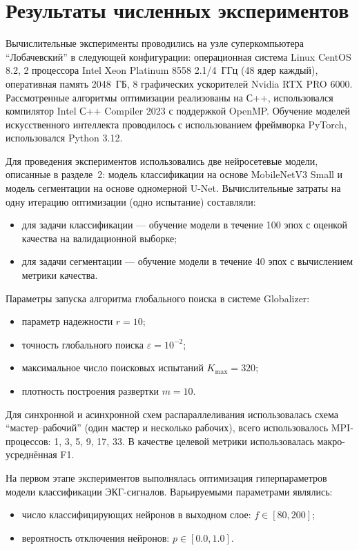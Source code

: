 \documentclass[10pt,a4paper]{book}
\begin{document}
\section{Результаты численных экспериментов}
\label{sec-result}

Вычислительные эксперименты проводились на узле суперкомпьютера ``Лобачевский'' в следующей конфигурации: операционная система Linux CentOS 8.2, 2 процессора Intel Xeon Platinum 8558 2.1/4~ГГц (48 ядер каждый), оперативная память 2048~ГБ, 8 графических ускорителей Nvidia RTX PRO 6000. Рассмотренные алгоритмы оптимизации реализованы на С++, использовался компилятор Intel С++ Compiler 2023 с поддержкой OpenMP. Обучение моделей искусственного интеллекта проводилось с использованием фреймворка PyTorch, использовался Python 3.12.

Для проведения экспериментов использовались две нейросетевые модели, описанные в разделе~2: модель классификации на основе MobileNetV3 Small и модель сегментации на основе одномерной U-Net. Вычислительные затраты на одну итерацию оптимизации (одно испытание) составляли:
\begin{itemize}
    \item для задачи классификации --- обучение модели в течение 100 эпох с оценкой качества на валидационной выборке;
    \item для задачи сегментации --- обучение модели в течение 40 эпох с вычислением метрики качества.
\end{itemize}

Параметры запуска алгоритма глобального поиска в системе Globalizer:
\begin{itemize}
    \item параметр надежности $r = 10$;
    \item точность глобального поиска $\varepsilon = 10^{-2}$;
    \item максимальное число поисковых испытаний $K_{\max} = 320$;
    \item плотность построения развертки $m = 10$.
\end{itemize}

Для синхронной и асинхронной схем распараллеливания использовалась схема ``мастер--рабочий'' (один мастер и несколько рабочих), всего использовалось MPI-процессов: 1, 3, 5, 9, 17, 33. В качестве целевой метрики использовалась макро-усреднённая F1.

На первом этапе экспериментов выполнялась оптимизация гиперпараметров модели классификации ЭКГ-сигналов. Варьируемыми параметрами являлись:
\begin{itemize}
    \item число классифицирующих нейронов в выходном слое: $f \in [80, 200]$;
    \item вероятность отключения нейронов: $p \in [0.0, 1.0]$.
\end{itemize}
\end{document}
